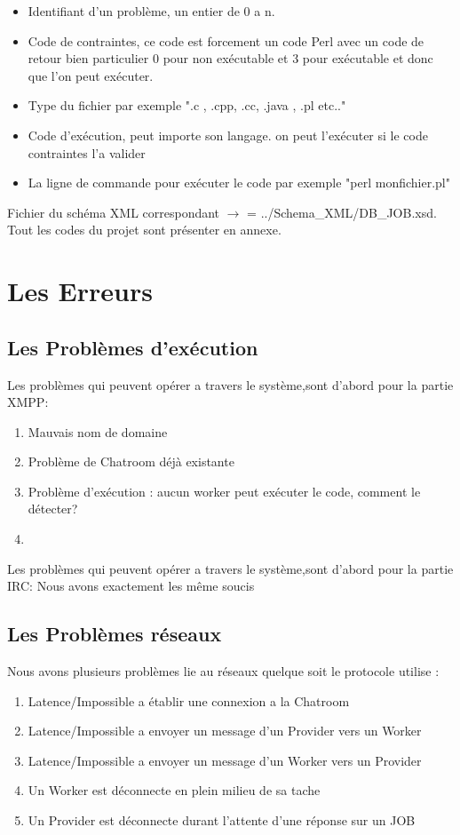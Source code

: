 \documentclass[11pt]{report}
\begin{document}
\begin{itemize}
\item Identifiant d'un problème, un entier de 0 a n.
\item Code de contraintes, ce code est forcement un code Perl avec un code de retour bien particulier 0 pour non exécutable  et 3 pour exécutable et donc que l'on peut exécuter. 
\item Type du fichier par exemple ".c , .cpp, .cc, .java , .pl etc.."
\item Code d’exécution, peut importe son langage. on peut l'exécuter si le code contraintes l'a valider 
\item La ligne de commande pour exécuter le code par exemple "perl monfichier.pl"
\end{itemize}

 Fichier du schéma XML correspondant $\rightarrow$ = ../Schema\_XML/DB\_JOB.xsd.
 Tout les codes du projet sont présenter en annexe.
\newpage
\chapter{Les Erreurs} 
\section{Les Problèmes d’exécution}
Les problèmes qui peuvent opérer a travers le système,sont d'abord pour la partie XMPP: 
\begin{enumerate}
\item Mauvais nom de domaine 
\item Problème de Chatroom déjà existante
\item Problème d’exécution : aucun worker peut exécuter le code, comment le détecter?
\item 
\end{enumerate}  
Les problèmes qui peuvent opérer a travers le système,sont d'abord pour la partie IRC: 
Nous avons exactement les même soucis 
\newpage
\section{Les Problèmes réseaux}
Nous avons plusieurs problèmes lie au réseaux quelque soit le protocole utilise :
\begin{enumerate}
\item Latence/Impossible a établir une  connexion a la Chatroom
\item Latence/Impossible a envoyer un  message d'un Provider vers un Worker
\item Latence/Impossible a envoyer un  message d'un Worker vers un Provider
\item Un Worker est déconnecte en plein milieu de sa tache
\item Un Provider est déconnecte durant l'attente d'une réponse sur un JOB
\end{enumerate}
\newpage
\end{document}
